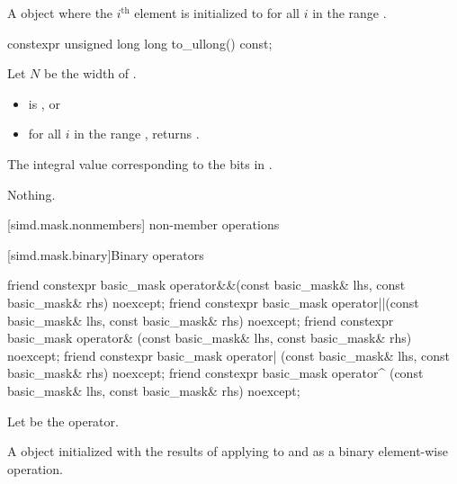 \begin{itemdescr}
\pnum
\returns
A  object where the $i^\text{th}$ element is initialized to
 for all $i$ in the range .
\end{itemdescr}

\begin{itemdecl}
constexpr unsigned long long to_ullong() const;
\end{itemdecl}

\begin{itemdescr}
\pnum
Let $N$ be the width of .

\pnum
\expects
\begin{itemize}
\item {} is , or
\item for all $i$ in the range ,  returns .
\end{itemize}

\pnum
\returns
The integral value corresponding to the bits in .

\pnum
\throws
Nothing.
\end{itemdescr}

[simd.mask.nonmembers]{ non-member operations}

[simd.mask.binary]{Binary operators}

\begin{itemdecl}
friend constexpr basic_mask
  operator&&(const basic_mask& lhs, const basic_mask& rhs) noexcept;
friend constexpr basic_mask
  operator||(const basic_mask& lhs, const basic_mask& rhs) noexcept;
friend constexpr basic_mask
  operator& (const basic_mask& lhs, const basic_mask& rhs) noexcept;
friend constexpr basic_mask
  operator| (const basic_mask& lhs, const basic_mask& rhs) noexcept;
friend constexpr basic_mask
  operator^ (const basic_mask& lhs, const basic_mask& rhs) noexcept;
\end{itemdecl}

\begin{itemdescr}
\pnum
Let  be the operator.

\pnum
\returns
A  object initialized with the results of applying
 to  and  as a binary element-wise
operation.
\end{itemdescr}

